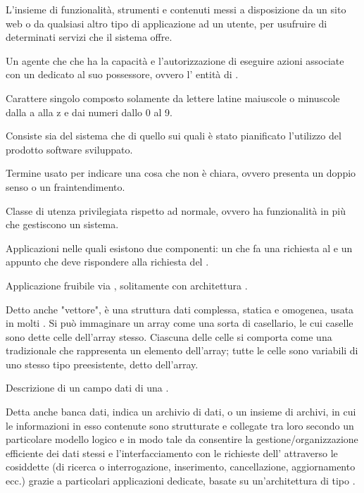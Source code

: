 \Inizio{}


{L'insieme di funzionalità, strumenti e contenuti messi a disposizione da un sito web o da qualsiasi altro tipo di applicazione ad un utente, per usufruire di determinati servizi che il sistema offre.}

{Un agente che che ha la capacità e l'autorizzazione di eseguire azioni associate con un  dedicato al suo possessore, ovvero l' entità di .}


{Carattere singolo composto solamente da lettere latine maiuscole o minuscole dalla a alla z e dai numeri dallo 0 al 9.}


{Consiste sia del sistema  che di quello  sui quali è stato pianificato l'utilizzo del prodotto software sviluppato.}


{Termine usato per indicare una cosa che non è chiara, ovvero presenta un doppio senso o un fraintendimento.}

{Classe di utenza privilegiata rispetto ad  normale, ovvero ha funzionalità in più che gestiscono un sistema.}

{Applicazioni nelle quali esistono due componenti: un  che fa una richiesta al  e un  appunto che deve rispondere alla richiesta del .}


{Applicazione fruibile via , solitamente con architettura .}


{Detto anche "vettore", è una struttura dati complessa, statica e omogenea, usata in molti . Si può immaginare un array come una sorta di casellario, le cui caselle sono dette celle dell'array stesso. Ciascuna delle celle si comporta come una  tradizionale che rappresenta un elemento dell'array; tutte le celle sono variabili di uno stesso tipo preesistente, detto  dell'array.}

{Descrizione di un campo dati di una .}



{Detta anche banca dati, indica un archivio di dati, o un insieme di archivi, in cui le informazioni in esso contenute sono strutturate e collegate tra loro secondo un particolare modello logico e in modo tale da consentire la gestione/organizzazione efficiente dei dati stessi e l'interfacciamento con le richieste dell' attraverso le cosiddette  (di ricerca o interrogazione, inserimento, cancellazione, aggiornamento ecc.) grazie a particolari applicazioni  dedicate, basate su un'architettura di tipo .}

